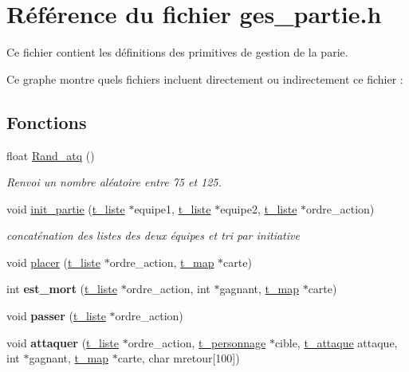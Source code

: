 \hypertarget{a00020}{}\section{Référence du fichier ges\+\_\+partie.\+h}
\label{a00020}


Ce fichier contient les définitions des primitives de gestion de la parie.  


Ce graphe montre quels fichiers incluent directement ou indirectement ce fichier \+:
\subsection*{Fonctions}
\begin{DoxyCompactItemize}
\item 
float \hyperlink{a00020_a16c4c901dacfc06ff4631688cd162d3a}{Rand\+\_\+atq} ()
\begin{DoxyCompactList}\small\item\em Renvoi un nombre aléatoire entre 75 et 125. \end{DoxyCompactList}\item 
void \hyperlink{a00020_a13a20b2cf9953abf4593dd9d7cc734a6}{init\+\_\+partie} (\hyperlink{a00006}{t\+\_\+liste} $\ast$equipe1, \hyperlink{a00006}{t\+\_\+liste} $\ast$equipe2, \hyperlink{a00006}{t\+\_\+liste} $\ast$ordre\+\_\+action)
\begin{DoxyCompactList}\small\item\em concaténation des listes des deux équipes et tri par initiative \end{DoxyCompactList}\item 
void \hyperlink{a00020_a41a1d27b41237396733145ba55fb9ca0}{placer} (\hyperlink{a00006}{t\+\_\+liste} $\ast$ordre\+\_\+action, \hyperlink{a00007}{t\+\_\+map} $\ast$carte)
\item 
int {\bfseries est\+\_\+mort} (\hyperlink{a00006}{t\+\_\+liste} $\ast$ordre\+\_\+action, int $\ast$gagnant, \hyperlink{a00007}{t\+\_\+map} $\ast$carte)\hypertarget{a00020_ab8eb413515574b9dce7701c79d807d8d}{}\label{a00020_ab8eb413515574b9dce7701c79d807d8d}

\item 
void {\bfseries passer} (\hyperlink{a00006}{t\+\_\+liste} $\ast$ordre\+\_\+action)\hypertarget{a00020_a016a187083e2fb18efad89a26fc02d69}{}\label{a00020_a016a187083e2fb18efad89a26fc02d69}

\item 
void {\bfseries attaquer} (\hyperlink{a00006}{t\+\_\+liste} $\ast$ordre\+\_\+action, \hyperlink{a00009}{t\+\_\+personnage} $\ast$cible, \hyperlink{a00003}{t\+\_\+attaque} attaque, int $\ast$gagnant, \hyperlink{a00007}{t\+\_\+map} $\ast$carte, char mretour\mbox{[}100\mbox{]})\hypertarget{a00020_a41d099b21befbd25c4e7effd38da869f}{}\label{a00020_a41d099b21befbd25c4e7effd38da869f}


\end{DoxyCompactItemize}
